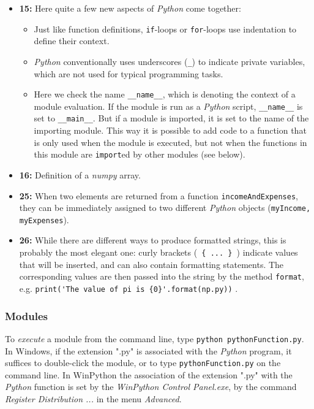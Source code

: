 \begin{itemize}
  \item \textbf{15:} Here quite a few new aspects of \emph{Python} come together:
      \begin{itemize}
        \item Just like function definitions, \lstinline{if}-loops or \lstinline{for}-loops use indentation to define their context.
        \item \emph{Python} conventionally uses underscores (\lstinline{_}) to indicate private variables, which are not used for typical programming tasks.
        \item Here we check the name \lstinline{__name__}, which is denoting the context of a module evaluation. If the module is run as a \emph{Python} script, \lstinline{__name__} is set to \lstinline{__main__}. But if a module is imported, it is set to the name of the importing module. This way it is possible to add code to a function that is only used when the module is executed, but not when the functions in this module are \lstinline{import}ed by other modules (see below).
      \end{itemize}

  \item \textbf{16:} Definition of a \emph{numpy} array.

  \item \textbf{25:} When two elements are returned from a function \lstinline{incomeAndExpenses}, they can be immediately assigned to two different \emph{Python} objects (\lstinline{myIncome, myExpenses}).

  \item \textbf{26:} While there are different ways to produce formatted strings, this is probably the most elegant one: curly brackets (\lstinline| { ... } |) indicate values that will be inserted, and can also contain formatting statements. The corresponding values are then passed into the string by the method \lstinline{format}, e.g. \lstinline|print('The value of pi is {0}'.format(np.py))| .
\end{itemize}

\subsubsection{Modules}

To \emph{execute} a module from the command line, type \lstinline{python pythonFunction.py}. In Windows, if the extension ".py" is associated with the \emph{Python} program, it suffices to double-click the module, or to type \lstinline{pythonFunction.py} on the command line. In WinPython the association of the extension ".py" with the \emph{Python} function is set by the \emph{WinPython Control Panel.exe}, by the command \emph{Register Distribution ...} in the menu \emph{Advanced}.

